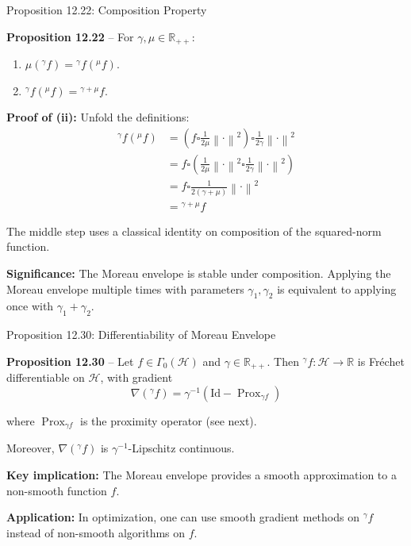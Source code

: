 \documentclass[aspectratio=169,10pt]{beamer}
\newcommand{\cH}{\mathcal{H}}
\newcommand{\R}{\mathbb{R}}
\newcommand{\norm}[1]{\left\|#1\right\|}
\newcommand{\Prox}{\operatorname{Prox}}
\newcommand{\co}{\square}
\newcommand{\me}[1]{{}^{#1}\!f}
\begin{document}
\begin{frame}[allowframebreaks]{Proposition 12.22: Composition Property}

  \textbf{Proposition 12.22} -- For $\gamma, \mu \in \R_{++}$:

  \begin{enumerate}
    \item[(i)] $\mu(\me{\gamma}) = \me{\gamma}(\me{\mu})$.
    \item[(ii)] $\me{\gamma}(\me{\mu}) = \me{\gamma + \mu}$.
  \end{enumerate}

  \vspace{0.5cm}

  \textbf{Proof of (ii):} Unfold the definitions:
  \begin{align}
    \me{\gamma}(\me{\mu})
    &= \left( f \co \frac{1}{2\mu}\norm{\cdot}^2 \right) \co \frac{1}{2\gamma}\norm{\cdot}^2 \\
    &= f \co \left( \frac{1}{2\mu}\norm{\cdot}^2 \co \frac{1}{2\gamma}\norm{\cdot}^2 \right) \\
    &= f \co \frac{1}{2(\gamma+\mu)} \norm{\cdot}^2 \\
    &= \me{\gamma + \mu}
  \end{align}

  The middle step uses a classical identity on composition of the
  squared-norm function.

  \framebreak

  \textbf{Significance:} The Moreau envelope is stable under composition. Applying the Moreau envelope multiple times with parameters $\gamma_1, \gamma_2$ is equivalent to applying once with $\gamma_1 + \gamma_2$.

\end{frame}

\begin{frame}{Proposition 12.30: Differentiability of Moreau Envelope}

  \textbf{Proposition 12.30} -- Let $f \in \Gamma_0(\cH)$ and $\gamma \in \R_{++}$.
  Then $\me{\gamma}: \cH \to \R$ is Fréchet differentiable on $\cH$, with gradient
  \[
    \nabla(\me{\gamma}) = \gamma^{-1} (\text{Id} - \Prox_{\gamma f})
  \]

  where $\Prox_{\gamma f}$ is the proximity operator (see next).

  Moreover, $\nabla(\me{\gamma})$ is $\gamma^{-1}$-Lipschitz continuous.

  \vspace{1cm}

  \textbf{Key implication:} The Moreau envelope provides a smooth
  approximation to a non-smooth function $f$.

  \vspace{0.5cm}

  \textbf{Application:} In optimization, one can use smooth gradient
  methods on $\me{\gamma}$ instead of non-smooth algorithms on $f$.

\end{frame}
\end{document}
